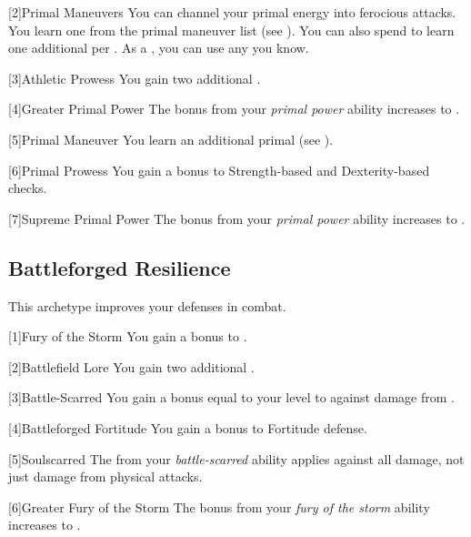         [2]{Primal Maneuvers}
        You can channel your primal energy into ferocious attacks.
        You learn one  from the primal maneuver list (see ).
        You can also spend  to learn one additional  per .
        As a , you can use any  you know.

        [3]{Athletic Prowess} You gain two additional .

        [4]{Greater Primal Power} The bonus from your \textit{primal power} ability increases to .

        [5]{Primal Maneuver}
        You learn an additional primal  (see ).

        [6]{Primal Prowess}
        You gain a  bonus to Strength-based and Dexterity-based checks.

        [7]{Supreme Primal Power}
        The bonus from your \textit{primal power} ability increases to .

    \subsection{Battleforged Resilience}
        This archetype improves your defenses in combat.

        [1]{Fury of the Storm} You gain a  bonus to .

        [2]{Battlefield Lore} You gain two additional .

        [3]{Battle-Scarred} You gain a bonus equal to your level to  against damage from .

        [4]{Battleforged Fortitude} You gain a  bonus to Fortitude defense.

        [5]{Soulscarred} The  from your \textit{battle-scarred} ability applies against all damage, not just damage from physical attacks.

        [6]{Greater Fury of the Storm}
        The bonus from your \textit{fury of the storm} ability increases to .

